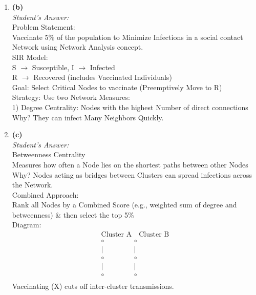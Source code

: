 \documentclass[a4paper,12pt]{article}
\begin{document}
\begin{enumerate}
\begin{enumerate}
        \item \textbf{(b)} \\
        \textit{Student's Answer:} \\
        Problem Statement: \\
        Vaccinate 5\% of the population to Minimize Infections in a social contact Network using Network Analysis concept. \\
        SIR Model: \\
        S $\rightarrow$ Susceptible, I $\rightarrow$ Infected \\
        R $\rightarrow$ Recovered (includes Vaccinated Individuals) \\
        Goal: Select Critical Nodes to vaccinate (Preemptively Move to R) \\
        Strategy: Use two Network Measures: \\
        1) Degree Centrality: Nodes with the highest Number of direct connections \\
        Why? They can infect Many Neighbors Quickly.

        \item \textbf{(c)} \\
        \textit{Student's Answer:} \\
        Betweenness Centrality \\
        Measures how often a Node lies on the shortest paths between other Nodes \\
        Why? Nodes acting as bridges between Clusters can spread infections across the Network. \\
        Combined Approach: \\
        Rank all Nodes by a Combined Score (e.g., weighted sum of degree and betweenness) \& then select the top 5\% \\
        Diagram: \\
        \[
        \begin{array}{c}
        \text{Cluster A} \quad \text{Cluster B} \\
        \circ \quad \quad \quad \quad \circ \\
        \mid \quad \quad \quad \quad \mid \\
        \circ \quad \quad \quad \quad \circ \\
        \mid \quad \quad \quad \quad \mid \\
        \circ \quad \quad \quad \quad \circ \\
        \end{array}
        \]
        Vaccinating (X) cuts off inter-cluster transmissions.
    \end{enumerate}


\end{enumerate}
\end{document}
